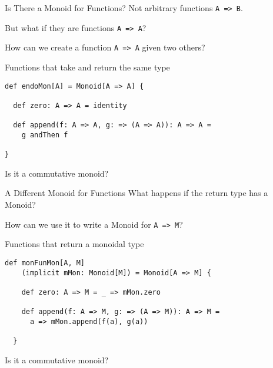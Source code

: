 \documentclass{beamer}
\begin{document}
\begin{frame}[fragile]{Is There a Monoid for Functions?}
  Not arbitrary functions \texttt{A => B}.

  But what if they are functions \texttt{A => A}?

  How can we create a function \texttt{A => A} given two others?
  \pause
  \begin{block}{Functions that take and return the same type}

  \begin{lstlisting}
def endoMon[A] = Monoid[A => A] {

  def zero: A => A = identity

  def append(f: A => A, g: => (A => A)): A => A =
    g andThen f

}
  \end{lstlisting}
  \end{block}
Is it a commutative monoid?
\end{frame}


\begin{frame}[fragile]{A Different Monoid for Functions}
  What happens if the \alert{return type has a Monoid?}

  How can we use it to write a Monoid for \texttt{A => M}?

  \begin{block}{Functions that return a monoidal type}

  \begin{lstlisting}
def monFunMon[A, M]
    (implicit mMon: Monoid[M]) = Monoid[A => M] {

    def zero: A => M = _ => mMon.zero

    def append(f: A => M, g: => (A => M)): A => M =
      a => mMon.append(f(a), g(a))

  }
  \end{lstlisting}
  \end{block}
Is it a commutative monoid?
\end{frame}
\end{document}
